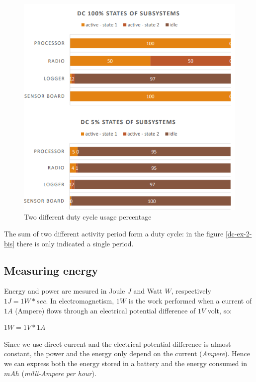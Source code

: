 \documentclass[10pt,a4paper]{report}
\theoremstyle{definition}
\begin{document}
\begin{figure}[h]
	\centering\includegraphics[scale=0.50]{images/Pasted image 20230324171858.png}
	\caption{Two different duty cycle usage percentage}
	\label{dc-ex-2}
\end{figure}

The sum of two different activity period form a duty cycle: in the figure \ref{dc-ex-2-bis} there is only indicated a single period.
\subsection{Measuring energy}\label{sec:measuring-energy}
Energy and power are mesured in Joule $J$ and Watt $W$, respectively $1J = 1W *sec$. In electromagnetism, $1W$ is the work performed when a current of $1A$ (Ampere) flows through an electrical potential difference of $1V$ volt, so:
\begin{center}
$1W = 1V * 1A$
\end{center}

Since we use direct current and the electrical potential difference is almost constant, the power and the energy only depend on the current (\textit{Ampere}).
Hence we can express both the energy stored in a battery and the energy consumed in $mAh$ (\textit{milli-Ampere per hour}).
\end{document}

